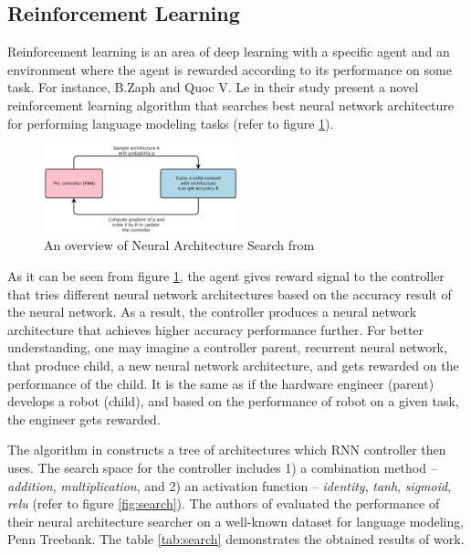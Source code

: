 \documentclass{IEEEtran}
\begin{document}
\subsection{Reinforcement Learning}

Reinforcement learning is an area of deep learning with a specific agent and an environment where the agent is rewarded according to its performance on some task. For instance, B.Zaph and Quoc V. Le in their study \cite{Quoc2017Reinforcement} present a novel reinforcement learning algorithm that searches best neural network architecture for performing language modeling tasks (refer to figure \ref{fig:rl}).

\begin{figure}[h]
	\centering
	\includegraphics[width=0.5\textwidth]{reinforcement}
	\caption{An overview of Neural Architecture Search from \cite{Quoc2017Reinforcement}}
	\label{fig:rl}
\end{figure}

As it can be seen from figure \ref{fig:rl}, the agent gives reward signal to the controller that tries different neural network architectures based on the accuracy result of the neural network. As a result, the controller produces a neural network architecture that achieves higher accuracy performance further. For better understanding, one may imagine a controller parent, recurrent neural network, that produce child, a new neural network architecture, and gets rewarded on the performance of the child. It is the same as if the hardware engineer (parent) develops a robot (child), and based on the performance of robot on a given task, the engineer gets rewarded.

The algorithm in \cite{Quoc2017Reinforcement} constructs a tree of architectures which RNN controller then uses. The search space for the controller includes 1) a combination method -- \textit{addition}, \textit{multiplication}, and 2) an activation function -- \textit{identity}, \textit{tanh}, \textit{sigmoid}, \textit{relu} (refer to figure \ref{fig:search}). The authors of \cite{Quoc2017Reinforcement} evaluated the performance of their neural architecture searcher on a well-known dataset for language modeling, Penn Treebank. The table \ref{tab:search} demonstrates the obtained results of \cite{Quoc2017Reinforcement} work.
\end{document}
